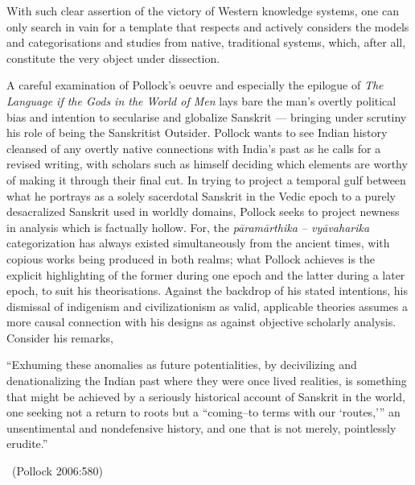 With such clear assertion of the victory of Western knowledge systems, one can only search in vain for a template that respects and actively considers the models and categorisations and studies from native, traditional systems, which, after all, constitute the very object under dissection.

A careful examination of Pollock’s oeuvre and especially the epilogue of \textit{The Language if the Gods in the World of Men} lays bare the man’s overtly political bias and intention to secularise and globalize Sanskrit — bringing under scrutiny his role of being the Sanskritist Outsider. Pollock wants to see Indian history cleansed of any overtly native connections with India’s past as he calls for a revised writing, with scholars such as himself deciding which elements are worthy of making it through their final cut. In trying to project a temporal gulf between what he portrays as a solely sacerdotal Sanskrit in the Vedic epoch to a purely desacralized Sanskrit used in worldly domains, Pollock seeks to project newness in analysis which is factually hollow. For, the \textit{pāramārthika – vyāvaharika} categorization has always existed simultaneously from the ancient times, with copious works being produced in both realms; what Pollock achieves is the explicit highlighting of the former during one epoch and the latter during a later epoch, to suit his theorisations. Against the backdrop of his stated intentions, his dismissal of indigenism and civilizationism as valid, applicable theories assumes a more causal connection with his designs as against objective scholarly analysis. Consider his remarks,

\begin{myquote}
“Exhuming these anomalies as future potentialities, by decivilizing and denationalizing the Indian past where they were once lived realities, is something that might be achieved by a seriously historical account of Sanskrit in the world, one seeking not a return to roots but a “coming–to terms with our ‘routes,’” an unsentimental and nondefensive history, and one that is not merely, pointlessly erudite.” 

~\hfill (Pollock 2006:580)
\end{myquote}

\vskip 5pt


